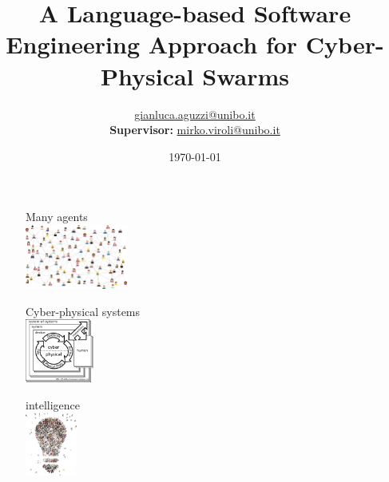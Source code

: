 \documentclass[presentation, 9pt]{beamer}\mode<presentation>{\usetheme{AMSBolognaFC}}
\title[A Soft-Eng Approach for CPSWs!]
{A Language-based Software Engineering Approach for Cyber-Physical Swarms}
\author[\sspeaker{G.Aguzzi}]
{\speaker{Gianluca Aguzzi} \href{mailto:gianluca.aguzzi@unibo.it}{gianluca.aguzzi@unibo.it} \\
\textbf{Supervisor:} \speaker{Mirko Viroli} \href{mailto:mirko.viroli@unibo.it}{mirko.viroli@unibo.it}}
\institute[DISI, Univ.\ Bologna]
{%
\textsc{Alma Mater Studiorum} -- Universit{\`a} di Bologna \\[0.1cm]
\textbf{PhD defense}\\[0.15cm]
}
\date[\today]{\today}
\begin{document}

\frame{\titlepage}

\section*{\refname}

\begin{frame}
\centering
{}
\begin{multicols}{3}
	\begin{figure}
		\large{Many  agents}\\[0.1cm]
		\includegraphics[width=0.3\textwidth]{img/network.png}
	\end{figure}
	\begin{figure}
		\large{Cyber-physical systems}\\[0.1cm]
		\includegraphics[width=0.2\textwidth]{img/cps.png}
	\end{figure}
	\begin{figure}
		\large{ intelligence}\\[0.1cm]
		\includegraphics[width=0.15\textwidth]{img/ci.png}
	\end{figure}
\end{multicols}
\end{frame}
\end{document}

